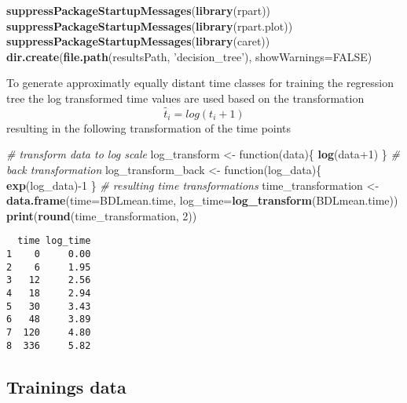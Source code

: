 \documentclass[]{article}
\newenvironment{Shaded}{\begin{snugshade}}{\end{snugshade}}
\newcommand{\KeywordTok}[1]{\textcolor[rgb]{0.13,0.29,0.53}{\textbf{{#1}}}}
\newcommand{\DataTypeTok}[1]{\textcolor[rgb]{0.13,0.29,0.53}{{#1}}}
\newcommand{\DecValTok}[1]{\textcolor[rgb]{0.00,0.00,0.81}{{#1}}}
\newcommand{\StringTok}[1]{\textcolor[rgb]{0.31,0.60,0.02}{{#1}}}
\newcommand{\CommentTok}[1]{\textcolor[rgb]{0.56,0.35,0.01}{\textit{{#1}}}}
\newcommand{\OtherTok}[1]{\textcolor[rgb]{0.56,0.35,0.01}{{#1}}}
\newcommand{\NormalTok}[1]{{#1}}
\begin{document}
\begin{Shaded}
\begin{Highlighting}[]
\KeywordTok{suppressPackageStartupMessages}\NormalTok{(}\KeywordTok{library}\NormalTok{(rpart))}
\KeywordTok{suppressPackageStartupMessages}\NormalTok{(}\KeywordTok{library}\NormalTok{(rpart.plot))}
\KeywordTok{suppressPackageStartupMessages}\NormalTok{(}\KeywordTok{library}\NormalTok{(caret))}
\KeywordTok{dir.create}\NormalTok{(}\KeywordTok{file.path}\NormalTok{(resultsPath, }\StringTok{'decision_tree'}\NormalTok{), }\DataTypeTok{showWarnings=}\OtherTok{FALSE}\NormalTok{)}
\end{Highlighting}
\end{Shaded}

To generate approximatly equally distant time classes for training the
regression tree the log transformed time values are used based on the
transformation \[\tilde{t_{i}} = log(t_{i} +1)\] resulting in the
following transformation of the time points

\begin{Shaded}
\begin{Highlighting}[]
\CommentTok{# transform data to log scale}
\NormalTok{log_transform <-}\StringTok{ }\NormalTok{function(data)\{}
  \KeywordTok{log}\NormalTok{(data}\DecValTok{+1}\NormalTok{)}
\NormalTok{\}}
\CommentTok{# back transformation}
\NormalTok{log_transform_back <-}\StringTok{ }\NormalTok{function(log_data)\{}
  \KeywordTok{exp}\NormalTok{(log_data)-}\DecValTok{1}
\NormalTok{\}}
\CommentTok{# resulting time transformations}
\NormalTok{time_transformation <-}\StringTok{ }\KeywordTok{data.frame}\NormalTok{(}\DataTypeTok{time=}\NormalTok{BDLmean.time, }
                                  \DataTypeTok{log_time=}\KeywordTok{log_transform}\NormalTok{(BDLmean.time))}
\KeywordTok{print}\NormalTok{(}\KeywordTok{round}\NormalTok{(time_transformation, }\DecValTok{2}\NormalTok{))}
\end{Highlighting}
\end{Shaded}

\begin{verbatim}
  time log_time
1    0     0.00
2    6     1.95
3   12     2.56
4   18     2.94
5   30     3.43
6   48     3.89
7  120     4.80
8  336     5.82
\end{verbatim}

\subsection{Trainings data}\label{trainings-data}
\end{document}
